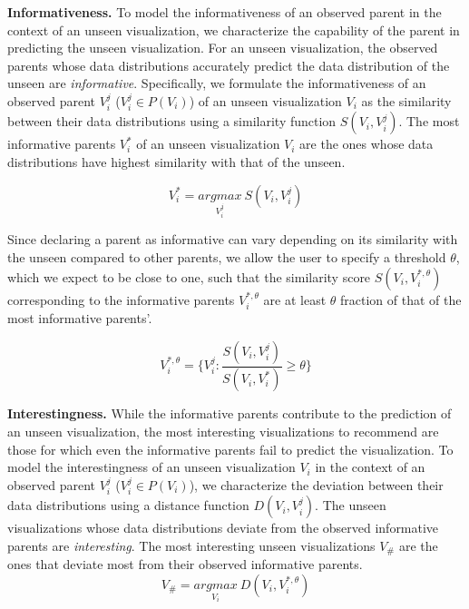 \textbf{Informativeness.} To model the informativeness of an observed parent in the context of an unseen visualization, we characterize the capability of the parent in predicting the unseen visualization. For an unseen visualization, the observed parents whose data distributions accurately predict the data distribution of the unseen are \emph{informative}. Specifically, we formulate the informativeness of an observed parent $V_i^j$ ($V_i^j \in P(V_i)$) of an unseen visualization $V_i$ as the similarity between their data distributions using a similarity function $S(V_i, V_i^j)$. The most informative parents $V_i^*$ of an unseen visualization $V_i$ are the ones whose data distributions have highest similarity with that of the unseen.

\begin{equation}
    V_i^*=\underset{V_i^j}{argmax}\ S(V_i, V_i^j)
\end{equation}

Since declaring a parent as informative can vary depending on its similarity with the unseen compared to other parents, we allow the user to specify a threshold $\theta$, which we expect to be close to one, such that the similarity score $S(V_i, V_i^{*, \theta})$ corresponding to the informative parents $V_i^{*, \theta}$ are at least $\theta$ fraction of that of the most informative parents'.

\begin{equation}
    V_i^{*, \theta} = \{V_i^j : \frac{S(V_i, V_i^j)}{S(V_i, V_i^*)} \ge \theta\}
\end{equation}

\textbf{Interestingness.} While the informative parents contribute to the prediction of an unseen visualization, the most interesting visualizations to recommend are those for which even the informative parents fail to predict the visualization. To model the interestingness of an unseen visualization $V_i$ in the context of an observed parent $V_i^j$ ($V_i^j \in P(V_i)$), we characterize the deviation between their data distributions using a distance function $D(V_i, V_i^j)$. The unseen visualizations whose data distributions deviate from the observed informative parents are \emph{interesting}. The most interesting unseen visualizations $V_\#$ are the ones that deviate most from their observed informative parents.
\begin{equation}
    V_\#=\underset{V_i}{argmax} \ D(V_i, V_i^{*, \theta})
\end{equation}


